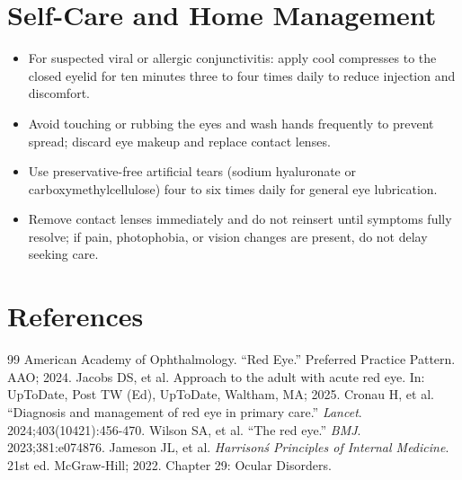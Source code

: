 \section*{Self-Care and Home Management}
\begin{itemize}
  \item For suspected viral or allergic conjunctivitis: apply cool compresses to the closed eyelid for ten minutes three to four times daily to reduce injection and discomfort.
  \item Avoid touching or rubbing the eyes and wash hands frequently to prevent spread; discard eye makeup and replace contact lenses.
  \item Use preservative-free artificial tears (sodium hyaluronate or carboxymethylcellulose) four to six times daily for general eye lubrication.
  \item Remove contact lenses immediately and do not reinsert until symptoms fully resolve; if pain, photophobia, or vision changes are present, do not delay seeking care.
\end{itemize}

\section*{References}
\begin{thebibliography}{99}
 American Academy of Ophthalmology. ``Red Eye.'' Preferred Practice Pattern. AAO; 2024.
 Jacobs DS, et al. Approach to the adult with acute red eye. In: UpToDate, Post TW (Ed), UpToDate, Waltham, MA; 2025.
 Cronau H, et al. ``Diagnosis and management of red eye in primary care.'' \emph{Lancet}. 2024;403(10421):456-470.
 Wilson SA, et al. ``The red eye.'' \emph{BMJ}. 2023;381:e074876.
 Jameson JL, et al. \emph{Harrison\'s Principles of Internal Medicine}. 21st ed. McGraw-Hill; 2022. Chapter 29: Ocular Disorders.
\end{thebibliography}
